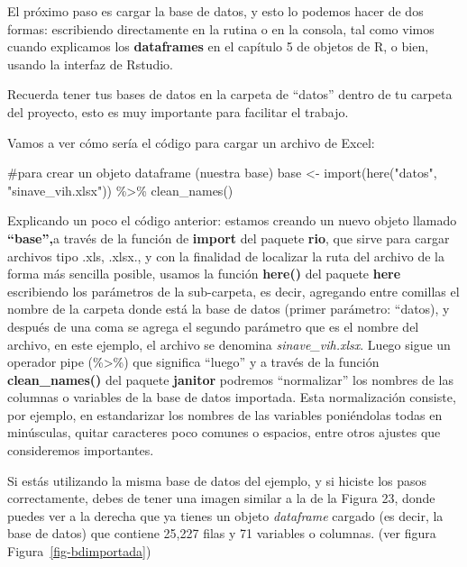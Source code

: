 \documentclass[
  letterpaper,
  DIV=11,
  numbers=noendperiod]{scrreprt}
\newenvironment{Shaded}{\begin{snugshade}}{\end{snugshade}}
\newcommand{\CommentTok}[1]{\textcolor[rgb]{0.37,0.37,0.37}{#1}}
\newcommand{\FunctionTok}[1]{\textcolor[rgb]{0.28,0.35,0.67}{#1}}
\newcommand{\NormalTok}[1]{\textcolor[rgb]{0.00,0.23,0.31}{#1}}
\newcommand{\OtherTok}[1]{\textcolor[rgb]{0.00,0.23,0.31}{#1}}
\newcommand{\SpecialCharTok}[1]{\textcolor[rgb]{0.37,0.37,0.37}{#1}}
\newcommand{\StringTok}[1]{\textcolor[rgb]{0.13,0.47,0.30}{#1}}
\begin{document}
El próximo paso es cargar la base de datos, y esto lo podemos hacer de
dos formas: escribiendo directamente en la rutina o en la consola, tal
como vimos cuando explicamos los \textbf{dataframes} en el capítulo 5 de
objetos de R, o bien, usando la interfaz de Rstudio.

Recuerda tener tus bases de datos en la carpeta de ``datos'' dentro de
tu carpeta del proyecto, esto es muy importante para facilitar el
trabajo.

Vamos a ver cómo sería el código para cargar un archivo de Excel:

\begin{Shaded}
\begin{Highlighting}[]
\CommentTok{\#para crear un objeto dataframe (nuestra base)}
\NormalTok{base }\OtherTok{\textless{}{-}} \FunctionTok{import}\NormalTok{(}\FunctionTok{here}\NormalTok{(}\StringTok{"datos"}\NormalTok{, }\StringTok{"sinave\_vih.xlsx"}\NormalTok{)) }\SpecialCharTok{\%\textgreater{}\%} 
         \FunctionTok{clean\_names}\NormalTok{()}
\end{Highlighting}
\end{Shaded}

Explicando un poco el código anterior: estamos creando un nuevo objeto
llamado \textbf{``base'',}a través de la función de \textbf{import} del
paquete \textbf{rio}, que sirve para cargar archivos tipo .xls, .xlsx.,
y con la finalidad de localizar la ruta del archivo de la forma más
sencilla posible, usamos la función \textbf{here()} del paquete
\textbf{here} escribiendo los parámetros de la sub-carpeta, es decir,
agregando entre comillas el nombre de la carpeta donde está la base de
datos (primer parámetro: ``datos), y después de una coma se agrega el
segundo parámetro que es el nombre del archivo, en este ejemplo, el
archivo se denomina \emph{sinave\_vih.xlsx}. Luego sigue un operador
pipe (\%\textgreater\%) que significa ``luego'' y a través de la función
\textbf{clean\_names()} del paquete \textbf{janitor} podremos
``normalizar'' los nombres de las columnas o variables de la base de
datos importada. Esta normalización consiste, por ejemplo, en
estandarizar los nombres de las variables poniéndolas todas en
minúsculas, quitar caracteres poco comunes o espacios, entre otros
ajustes que consideremos importantes.

Si estás utilizando la misma base de datos del ejemplo, y si hiciste los
pasos correctamente, debes de tener una imagen similar a la de la Figura
23, donde puedes ver a la derecha que ya tienes un objeto
\emph{dataframe} cargado (es decir, la base de datos) que contiene
25,227 filas y 71 variables o columnas. (ver figura
Figura~\ref{fig-bdimportada})
\end{document}
